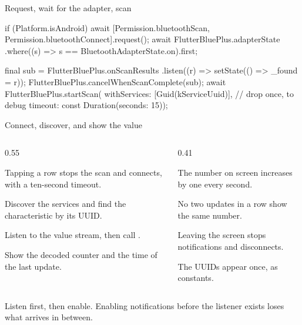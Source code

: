 \documentclass[10pt,aspectratio=169,t]{beamer}
\begin{document}
\begin{frame}[fragile,eyebrow=Reference]{Request, wait for the adapter, scan}
\begin{dart}
if (Platform.isAndroid) {
  await [Permission.bluetoothScan,
         Permission.bluetoothConnect].request();
}
await FlutterBluePlus.adapterState
    .where((s) => s == BluetoothAdapterState.on).first;

final sub = FlutterBluePlus.onScanResults
    .listen((r) => setState(() => _found = r));
FlutterBluePlus.cancelWhenScanComplete(sub);
await FlutterBluePlus.startScan(
    withServices: [Guid(kServiceUuid)],   // drop once, to debug
    timeout: const Duration(seconds: 15));
\end{dart}
\end{frame}

\begin{frame}[eyebrow=Task II]{Connect, discover, and show the value}
  \begin{columns}[T]
    \begin{column}{0.55\textwidth}
      \begin{steps}
        \item Tapping a row stops the scan and connects, with a ten-second timeout.
        \item Discover the services and find the characteristic by its UUID.
        \item Listen to the value stream, then call .
        \item Show the decoded counter and the time of the last update.
      \end{steps}
    \end{column}
    \begin{column}{0.41\textwidth}
      \begin{checklist}
        \item The number on screen increases by one every second.
        \item No two updates in a row show the same number.
        \item Leaving the screen stops notifications and disconnects.
        \item The UUIDs appear once, as constants.
      \end{checklist}
    \end{column}
  \end{columns}
  \begin{takeaway}{Listen first, then enable.}
    Enabling notifications before the listener exists loses what arrives in between.
  \end{takeaway}
\end{frame}
\end{document}
